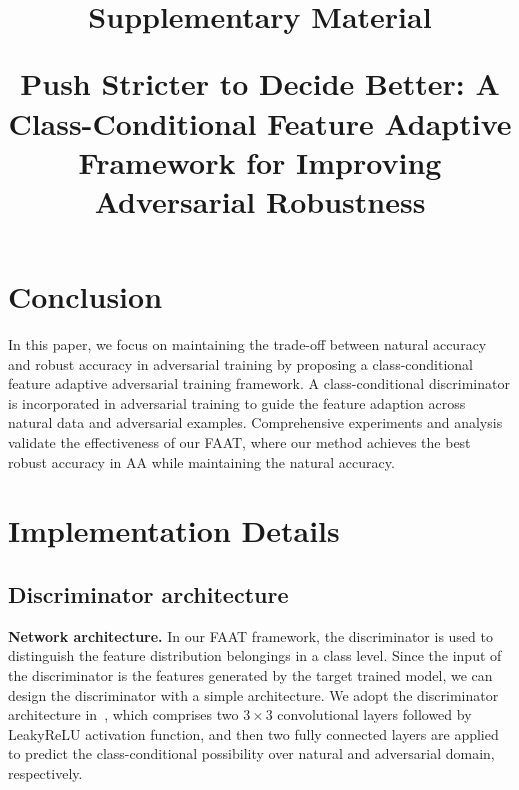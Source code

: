 \documentclass[10pt,twocolumn,letterpaper]{article}
\begin{document}
    \fi

\section{Conclusion}\label{sec:conclusion}
In this paper, we focus on maintaining the trade-off between natural accuracy and robust accuracy in adversarial training by proposing a class-conditional feature adaptive adversarial training framework. A class-conditional discriminator is incorporated in adversarial training to guide the feature adaption across natural data and adversarial examples. Comprehensive experiments and analysis validate the effectiveness of our FAAT, where our method achieves the best robust accuracy in AA while maintaining the natural accuracy.

{\small


}


\newpage
\onecolumn

\title{\centering \Large \textbf{Supplementary Material}\\ 
\begin{center}
    \large \textbf{Push Stricter to Decide Better: A Class-Conditional Feature Adaptive Framework for Improving Adversarial Robustness}
\end{center} }  %

\maketitle
\thispagestyle{empty}
\appendix

\section{Implementation Details}
\subsection{Discriminator architecture}
\noindent\textbf{Network architecture.} In our FAAT framework, the discriminator is used to distinguish the feature distribution belongings in a class level. Since the input of the discriminator is the features generated by the target trained model, we can design the discriminator with a simple architecture. We adopt the discriminator architecture in~\cite{Haoran_2020_ECCV}, which comprises two $3\times 3$ convolutional layers followed by LeakyReLU activation function, and then two fully connected layers are applied to predict the class-conditional possibility over natural and adversarial domain, respectively.
\vspace{5pt}
\end{document}
